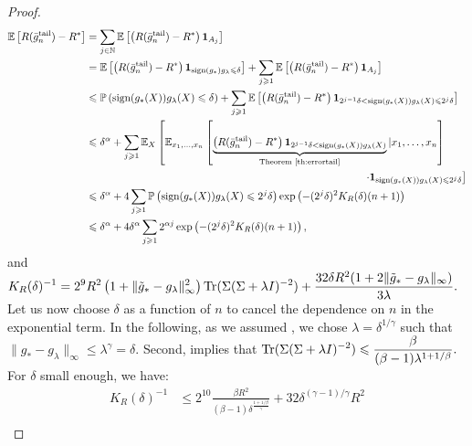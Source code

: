 \begin{proof}
\begin{align*}
\E \left[ R(\bar{g}_n^{\textrm {tail}}) - R^* \right] &= \sum_{j \in \mathbb{N} } \E \left[ \left(R(\bar{g}_n^{\textrm {tail}}) - R^*\right) \mathbf{1}_{A_j} \right] \\
%
&= \E \left[ \left(R(\bar{g}_n^{\textrm {tail}}) - R^*\right) \mathbf{1}_{{\textrm {sign} (g_*) g_\lambda \leqslant \delta }} \right] + \sum_{j \geqslant 1 }   \E \left[ \left(R(\bar{g}_n^{\textrm {tail}}) - R^*\right) \mathbf{1}_{A_j} \right] \\
%
&\leqslant \P \left({\textrm {sign} (g_*(X)) g_\lambda(X) \leqslant \delta } \right) + \sum_{j \geqslant 1 }   \E \left[ \left(R(\bar{g}_n^{\textrm {tail}}) - R^*\right) \mathbf{1}_{2^{j-1} \delta < {\textrm {sign} (g_*(X)) g_\lambda(X) \leqslant 2^{j} \delta }} \right] \\
%
&\leqslant \delta^\alpha + \sum_{j \geqslant 1 }   \E_X \left[\E_{x_1,\dots,x_n} \left[ \underbrace{\left(R(\bar{g}_n^{\textrm {tail}}) - R^*\right) \mathbf{1}_{2^{j-1} \delta < {\textrm {sign} (g_*(X)) g_\lambda(X)}} }_{\textrm {Theorem\ \ref{th:errortail}}} | x_1,\dots,x_n \right] \right. \\
& \hspace{9.23cm} \left. \cdot \mathbf{1}_{ {\textrm {sign} (g_*(X)) g_\lambda(X) \leqslant 2^{j} \delta }} \right]  \\
%
&\leqslant \delta^\alpha + 4 \sum_{j \geqslant 1 }   \P \left({\textrm {sign} (g_*(X)) g_\lambda(X) \leqslant 2^{j} \delta } \right) \exp\left( - (2^j\delta)^2 K_R(\delta) (n+1)\right)  \\
%
&\leqslant \delta^\alpha + 4 \delta^\alpha \sum_{j \geqslant 1 }  2^{\alpha j } \exp\left( - (2^j\delta)^2 K_R(\delta) (n+1)\right),
\end{align*}
%
and $\displaystyle K_R(\delta)^{-1} = 2^9 R ^2  \left(1+\|\tilde{g}_*- g_\lambda\|^2_\infty\right)\operatorname{Tr}(\Sigma(\Sigma + \lambda I)^{-2})+\frac{32 \delta R^2 ( 1 + 2 \| \tilde{g}_* - g_\lambda\|_\infty )}{3\lambda} .$ Let us now choose $\delta $ as a function of $n$ to cancel the dependence on $n$ in the exponential term. In the following, as we assumed , we chose $\lambda = \delta^{1/\gamma}$  such that $\|g_* - g_\lambda\|_\infty \leqslant \lambda^\gamma = \delta$. Second,  implies \citep[see][]{caponnetto2007optimal} that $\displaystyle \operatorname{Tr}(\Sigma(\Sigma + \lambda I)^{-2}) \leqslant \frac{\beta}{(\beta-1) \lambda^{1+1/\beta}}.$ For $\delta$ small enough, we have:
\begin{align*}
K_R(\delta)^{-1} &\leqslant  2^{10}  \frac{\beta R ^2}{(\beta-1) \delta^{\frac{1+1/\beta}{\gamma}}} +32 \delta^{(\gamma-1)/\gamma} R^2 \\

\end{align*}
\end{proof}
